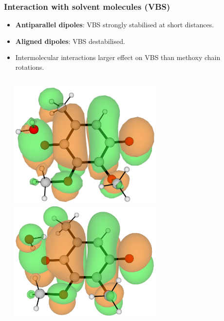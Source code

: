 \documentclass[9pt,t,xcolor=table]{beamer}
\begin{document}
\begin{frame}
	\frametitle{\huge Interaction with solvent molecules (VBS)}\large
	\begin{itemize}
		\item \textbf{Antiparallel dipoles}: VBS strongly stabilised at short distances.
		\item \textbf{Aligned dipoles}: VBS destabilised.
		\item Intermolecular interactions larger effect on VBS than methoxy chain rotations.
	\end{itemize}
	\vspace{5pt}
	\begin{columns}[c]
		\begin{column}{0.7\textwidth}
			\centering
			\small	
			
		\end{column}
		\hspace{40pt}
		\begin{column}{0.3\textwidth}
			\centering
	 		\includegraphics[width=0.6\textwidth]{Figs/Q0_H2O_VBS.png}\\
			\vfill
			\includegraphics[width=0.6\textwidth]{Figs/Q0_H2O_H_VBS.png}	
		\end{column}
	\end{columns}		
\end{frame}
\end{document}
